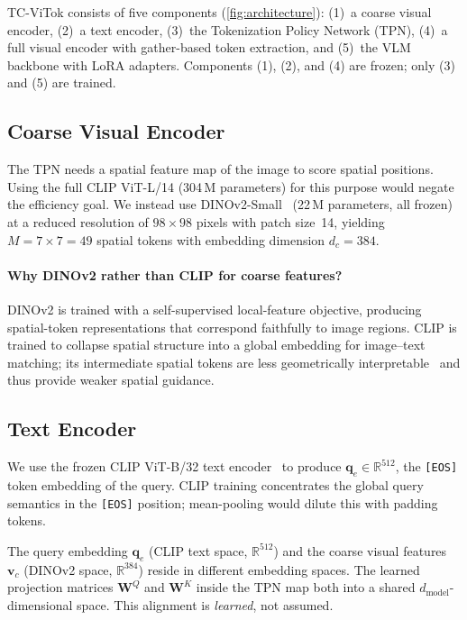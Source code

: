 \documentclass[11pt,a4paper]{article}
\newcommand{\R}{\mathbb{R}}
\newcommand{\vc}{\mathbf{v}_c}
\newcommand{\qe}{\mathbf{q}_e}
\begin{document}
TC-ViTok consists of five components (\cref{fig:architecture}):
(1)~a coarse visual encoder,
(2)~a text encoder,
(3)~the Tokenization Policy Network (TPN),
(4)~a full visual encoder with gather-based token extraction, and
(5)~the VLM backbone with LoRA adapters.
Components (1), (2), and (4) are frozen; only (3) and (5) are trained.

\subsection{Coarse Visual Encoder}
\label{subsec:coarse_enc}

The TPN needs a spatial feature map of the image to score spatial positions.
Using the full CLIP ViT-L/14 (304\,M parameters) for this purpose would
negate the efficiency goal.
We instead use DINOv2-Small~\citep{oquab2023dinov2} (22\,M parameters, all
frozen) at a reduced resolution of $98{\times}98$ pixels with patch size~14,
yielding $M = 7 \times 7 = 49$ spatial tokens with embedding dimension
$d_c{=}384$.

\paragraph{Why DINOv2 rather than CLIP for coarse features?}
DINOv2 is trained with a self-supervised local-feature objective, producing
spatial-token representations that correspond faithfully to image regions.
CLIP is trained to collapse spatial structure into a global embedding for
image--text matching; its intermediate spatial tokens are less geometrically
interpretable~\citep{oquab2023dinov2} and thus provide weaker spatial
guidance.

\subsection{Text Encoder}
\label{subsec:text_enc}

We use the frozen CLIP ViT-B/32 text encoder~\citep{radford2021learning} to
produce $\qe \in \R^{512}$, the \texttt{[EOS]} token embedding of the
query.
CLIP training concentrates the global query semantics in the \texttt{[EOS]}
position; mean-pooling would dilute this with padding tokens.

\begin{notebox}[title={Cross-space alignment}]
The query embedding $\qe$ (CLIP text space, $\R^{512}$) and the coarse visual
features $\vc$ (DINOv2 space, $\R^{384}$) reside in different embedding
spaces.
The learned projection matrices $\mathbf{W}^Q$ and $\mathbf{W}^K$ inside the
TPN map both into a shared $d_{\mathrm{model}}$-dimensional space.
This alignment is \emph{learned}, not assumed.
\end{notebox}
\end{document}
